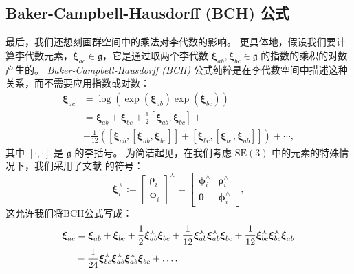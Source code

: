 \subsection{Baker-Campbell-Hausdorff (BCH) 公式}

最后，我们还想刻画群空间中的乘法对李代数的影响。 
更具体地，假设我们要计算李代数元素，$\boldsymbol{\xi}_{ac}\in \mathfrak{g}$，它是通过取两个李代数 $\boldsymbol{\xi}_{ab}, \boldsymbol{\xi}_{bc} \in \mathfrak{g}$ 的指数的乘积的对数产生的。 
 \textit{Baker-Campbell-Hausdorff (BCH)} 公式纯粹是在李代数空间中描述这种关系，而不需要应用指数或对数：
\begin{align}
    \boldsymbol{\xi}_{ac} &= 
    \operatorname{log}( \operatorname{exp}(\boldsymbol{\xi}_{ab}) \operatorname{exp}(\boldsymbol{\xi}_{bc})) \label{eq:BCH}\\
    &= \boldsymbol{\xi}_{ab} + \boldsymbol{\xi}_{bc} + \frac{1}{2}[\boldsymbol{\xi}_{ab}, \boldsymbol{\xi}_{bc}] + \nonumber \\ 
    & + \frac{1}{12}([\boldsymbol{\xi}_{ab}, [\boldsymbol{\xi}_{ab}, \boldsymbol{\xi}_{bc}]] + [\boldsymbol{\xi}_{bc},[\boldsymbol{\xi}_{bc},\boldsymbol{\xi}_{ab}]]) + \cdots\nonumber,
\end{align}
其中 $[\cdot, \cdot]$ 是 $\mathfrak{g}$ \cite[(7.18)]{barfoot2017state} 的李括号。 
为简洁起见，在我们考虑 $\mathrm{SE}(3)$ 中的元素的特殊情况下，我们采用了文献 \cite{barfoot2014associating} 的符号： 
\begin{equation}
    \boldsymbol{\xi}_i^\curlywedge := \left[ \begin{array}{c}
         \boldsymbol{\rho}_i \\
          \boldsymbol{\phi}_i
    \end{array} \right]^\curlywedge = 
    \left[ \begin{array}{cc}
        \boldsymbol{\phi}_i^\wedge & \boldsymbol{\rho}_i^\wedge  \\
        \mathbf{0} &  \boldsymbol{\phi}_i^\wedge
    \end{array} \right],
\end{equation}
这允许我们将BCH公式写成：
\begin{align}
    \xib{ac} &= \xib{ab} + \xib{bc} + \frac{1}{2}\xic{ab}\xib{bc} + \frac{1}{12}\xic{ab}\xic{ab}\xib{bc} + \frac{1}{12}\xic{bc}\xic{bc}\xib{ab} \nonumber\\
    &- \frac{1}{24}\xic{bc}\xic{ab}\xic{ab}\xib{bc} + \dots. \label{eq:BCH_SE3}
\end{align}

